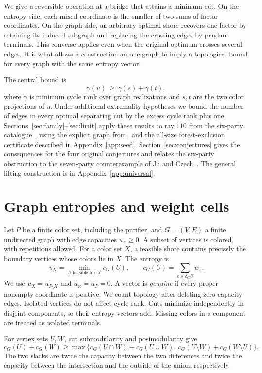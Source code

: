 \documentclass[11pt]{article}
\begin{document}
We give a reversible operation at a bridge that attains a minimum cut.
On the entropy side, each mixed coordinate is the smaller of two sums
of factor coordinates. On the graph side, an arbitrary optimal shore
recovers one factor by retaining its induced subgraph and replacing the
crossing edges by pendant terminals. This converse applies even when
the original optimum crosses several edges. It is what allows a
construction on one graph to imply a topological bound for every graph
with the same entropy vector.

The central bound is
\[
 \gamma(u)\ \geq\ \gamma(s)+\gamma(t),
\]
where \(\gamma\) is minimum cycle rank over graph realizations and \(s,t\)
are the two color projections of \(u\). Under additional extremality
hypotheses we bound the number of edges in every optimal separating
cut by the excess cycle rank plus one. Sections~\ref{sec:family}--\ref{sec:limit}
apply these results to ray \(110\) from the six-party catalogue~\cite{hhr2025},
using the explicit graph from~\cite{fletcher} and the all-size
forest-exclusion certificate described in Appendix~\ref{app:seed}.
Section~\ref{sec:conjectures} gives the consequences for the four
original conjectures and relates the six-party obstruction to the
seven-party counterexample of Ju and Czech~\cite{juczech2026}. The
general lifting construction is in Appendix~\ref{app:universal}.

\section{Graph entropies and weight cells}
\label{sec:notation}

Let \(P\) be a finite color set, including the purifier, and \(G=(V,E)\)
a finite undirected graph with edge capacities \(w_e\geq 0\). A subset of
vertices is colored, with repetitions allowed. For a color set \(X\),
a feasible shore contains precisely the boundary vertices whose colors
lie in \(X\). The entropy is
\[
 u_X=\min_{U\text{ feasible for }X} c_G(U),\qquad
 c_G(U)=\sum_{e\in\delta_G U}w_e.
\]
We use \(u_X=u_{P\setminus X}\) and \(u_\varnothing=u_P=0\). A vector is
\emph{genuine} if every proper nonempty coordinate is positive. We count
topology after deleting zero-capacity edges. Isolated vertices do not
affect cycle rank. Cuts minimize independently in disjoint components,
so their entropy vectors add. Missing colors in a component are treated
as isolated terminals.

For vertex sets \(U,W\), cut submodularity and posimodularity give
\[
 c_G(U)+c_G(W)\geq
 \max\bigl\{c_G(U\cap W)+c_G(U\cup W),\
            c_G(U\setminus W)+c_G(W\setminus U)\bigr\}.
\]
The two slacks are twice the capacity between the two differences
and twice the capacity between the intersection and the outside of
the union, respectively.
\end{document}
